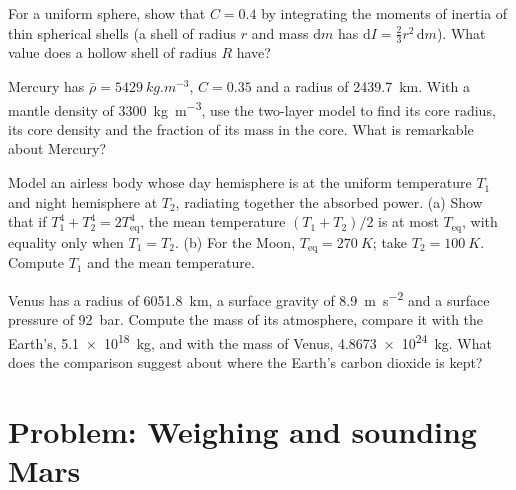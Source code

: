 \begin{exercise}[$\star\star$]\label{exo:b1:comparative-planetology:9}
For a uniform sphere, show that $C = 0.4$ by integrating the moments of
inertia of thin spherical shells (a shell of radius $r$ and mass
$\mathrm dm$ has $\mathrm dI = \tfrac23 r^2\,\mathrm dm$). What value does a
hollow shell of radius $R$ have?
\end{exercise}

\begin{exercise}[$\star\star\star$]\label{exo:b1:comparative-planetology:10}
Mercury has $\bar\rho = \qty{5429}{kg.m^{-3}}$, $C = 0.35$ and a radius of
\qty{2439.7}{km}. With a mantle density of \qty{3300}{kg.m^{-3}}, use the
two-layer model to find its core radius, its core density and the fraction
of its mass in the core. What is remarkable about Mercury?
\end{exercise}

\begin{exercise}[$\star\star\star$]\label{exo:b1:comparative-planetology:11}
Model an airless body whose day hemisphere is at the uniform temperature
$T_1$ and night hemisphere at $T_2$, radiating together the absorbed power.
(a) Show that if $T_1^4 + T_2^4 = 2T_\mathrm{eq}^4$, the mean temperature
$(T_1 + T_2)/2$ is at most $T_\mathrm{eq}$, with equality only when
$T_1 = T_2$. (b) For the Moon, $T_\mathrm{eq} = \qty{270}{K}$; take
$T_2 = \qty{100}{K}$. Compute $T_1$ and the mean temperature.
\end{exercise}

\begin{exercise}[$\star\star\star$]\label{exo:b1:comparative-planetology:12}
Venus has a radius of \qty{6051.8}{km}, a surface gravity of
\qty{8.9}{m.s^{-2}} and a surface pressure of \qty{92}{bar}. Compute the
mass of its atmosphere, compare it with the Earth's, \qty{5.1e18}{kg}, and
with the mass of Venus, \qty{4.8673e24}{kg}. What does the comparison
suggest about where the Earth's carbon dioxide is kept?
\end{exercise}

\section{Problem: Weighing and sounding Mars}

